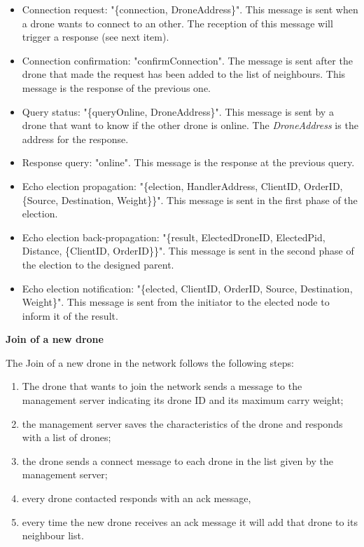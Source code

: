 \documentclass[a4paper, oneside]{memoir}
\begin{document}
\begin{itemize}
	\item Connection request: "\{connection, DroneAddress\}".
	This message is sent when a drone wants to connect to an other. The reception of this message will trigger a response (see next item).

	\item Connection confirmation: "confirmConnection".
	The message is sent after the drone that made the request has been added to the list of neighbours. This message is the response of the previous one.

	\item Query status: "\{queryOnline, DroneAddress\}".
	This message is sent by a drone that want to know if the other drone is online. The \textit{DroneAddress} is the address for the response.

	\item Response query: "online".
	This message is the response at the previous query.

	\item Echo election propagation: "\{election, HandlerAddress, ClientID, OrderID, \{Source, Destination, Weight\}\}".
	This message is sent in the first phase of the election.

	\item Echo election back-propagation: "\{result, ElectedDroneID, ElectedPid, Distance, \{ClientID, OrderID\}\}".
	This message is sent in the second phase of the election to the designed parent.

	\item Echo election notification: "\{elected, ClientID, OrderID, Source, Destination, Weight\}".
	This message is sent from the initiator to the elected node to inform it of the result.
\end{itemize}
\newpage


\textbf{Join of a new drone}

The Join of a new drone in the network follows the following steps:
\begin{enumerate}
\item The drone that wants to join the network sends a message to the management server indicating its drone ID and its maximum carry weight;
\item the management server saves the characteristics of the drone and responds with a list of drones;
\item the drone sends a connect message to each drone in the list given by the management server;
\item every drone contacted responds with an ack message,
\item every time the new drone receives an ack message it will add that drone to its neighbour list.
\end{enumerate}
\end{document}
